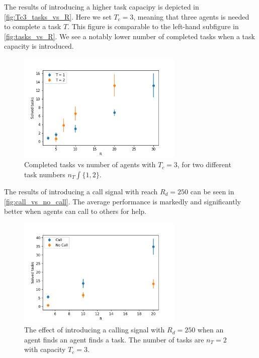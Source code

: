 \documentclass[11pt]{article}
\begin{document}
    The results of introducing a higher task capacipy is depicted in
    \autoref{fig:Tc3_tasks_vs_R}. Here we set $T_c=3$, meaning that 
    three agents is needed to complete a task $T$. This figure is 
    comparable to the left-hand subfigure in \autoref{fig:tasks_vs_R}.
    We see a notably lower number of completed tasks when a task 
    capacity is introduced.

    \begin{figure}
        \centering
        \includegraphics[width=0.7\textwidth]{figures/Tc3_tasks_vs_R.png}
        \caption{
            Completed tasks vs number of agents with $T_c=3$, for two different 
            task numbers $n_T \int \{1, 2\}$.
        }
        \label{fig:Tc3_tasks_vs_R}
    \end{figure}

    The results of introducing a call signal with reach $R_d=250$ can be 
    seen in \autoref{fig:call_vs_no_call}. The average performance is 
    markedly and significantly better when agents can call to others for help.

    \begin{figure}
        \centering
        \includegraphics[width=0.7\textwidth]{figures/call_vs_no_call.png} 
        \caption{
            The effect of introducing a calling signal with $R_d=250$ when an 
            agent finds an agent finds a task. The number of tasks are $n_T=2$ 
            with capacity $T_c=3$.
        }
        \label{fig:call_vs_no_call}
    \end{figure}
\end{document}
